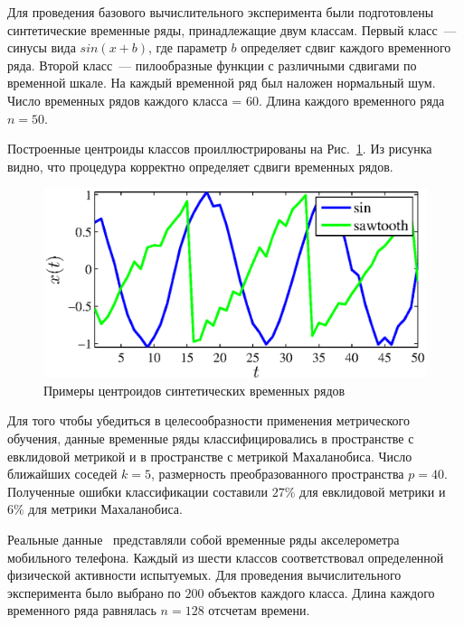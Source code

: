 	Для проведения базового вычислительного эксперимента были подготовлены синтетические временные ряды, принадлежащие двум классам.
	Первый класс~--- синусы вида $sin(x + b)$, где параметр $b$ определяет сдвиг каждого временного ряда.
	Второй класс~--- пилообразные функции с различными сдвигами по временной шкале.
	На каждый временной ряд был наложен нормальный шум.
	Число временных рядов каждого класса = 60.
	Длина каждого временного ряда $n = 50$.
	
	Построенные центроиды классов проиллюстрированы на Рис.~\ref{ch5:fig:centroids_synthetic}.
	Из рисунка видно, что процедура корректно определяет сдвиги временных рядов.
	\begin{figure}[ht]
		\centering
		\includegraphics[width=0.5\linewidth]{figs/ch5/centroids_synthetic_noize}
		\caption{Примеры центроидов синтетических временных рядов}
		\label{ch5:fig:centroids_synthetic}
	\end{figure}
	
	Для того чтобы убедиться в целесообразности применения метрического обучения, данные
	временные ряды классифицировались в пространстве с евклидовой метрикой и в пространстве с метрикой Махаланобиса.
	Число ближайших соседей $k = 5$, размерность преобразованного пространства $p = 40$.
	Полученные ошибки классификации составили $27\%$ для евклидовой метрики и $6\%$ для метрики Махаланобиса.
	
	Реальные данные~\cite{wisdm} представляли собой временные ряды акселерометра мобильного телефона.
	Каждый из шести классов соответствовал определенной физической активности испытуемых.
	Для проведения вычислительного эксперимента было выбрано по $200$ объектов каждого класса.
	Длина каждого временного ряда равнялась $n = 128$ отсчетам времени.
	
